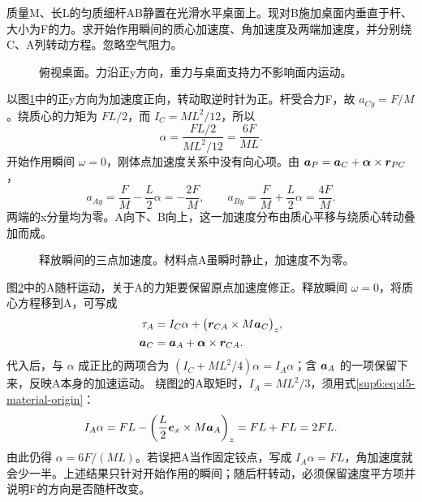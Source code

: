 \begin{example}[运动杆端取矩]\label{sup6:problem-example-1}\label{sup6:ex:d5-e1}
质量M、长L的匀质细杆AB静置在光滑水平桌面上。现对B施加桌面内垂直于杆、大小为F的力。求开始作用瞬间的质心加速度、角加速度及两端加速度，并分别绕C、A列转动方程。忽略空气阻力。
\end{example}
\begin{figure}[H]\centering
{}
\caption{俯视桌面。力沿正y方向，重力与桌面支持力不影响面内运动。}\label{sup6:fig:d5-e1-q}
\end{figure}
\begin{solution}
以图\ref{sup6:fig:d5-e1-q}中的正y方向为加速度正向，转动取逆时针为正。杆受合力F，故 $a_{Cy}=F/M$。绕质心的力矩为 $FL/2$，而 $I_C=ML^2/12$，所以
\[
\alpha=\frac{FL/2}{ML^2/12}=\frac{6F}{ML}.
\]
开始作用瞬间 $\omega=0$，刚体点加速度关系中没有向心项。由 $\bm{a}_P=\bm{a}_C+\bm{\alpha}\times\bm{r}_{PC}$，
\[
a_{Ay}=\frac FM-\frac L2\alpha=-\frac{2F}M,
\qquad a_{By}=\frac FM+\frac L2\alpha=\frac{4F}M.
\]
两端的x分量均为零。A向下、B向上，这一加速度分布由质心平移与绕质心转动叠加而成。
\begin{figure}[H]\centering
{}
\caption{释放瞬间的三点加速度。材料点A虽瞬时静止，加速度不为零。}\label{sup6:fig:d5-e1-s}
\end{figure}
图\ref{sup6:fig:d5-e1-s}中的A随杆运动，关于A的力矩要保留原点加速度修正。释放瞬间 $\omega=0$，将质心方程移到A，可写成
\[
\begin{aligned}
\tau_A&=I_C\alpha+\big(\bm{r}_{CA}\times M\bm{a}_C\big)_z,\\
\bm{a}_C&=\bm{a}_A+\bm{\alpha}\times\bm{r}_{CA}.
\end{aligned}
\]
代入后，与 $\alpha$ 成正比的两项合为 $(I_C+ML^2/4)\alpha=I_A\alpha$；含 $\bm{a}_A$ 的一项保留下来，反映A本身的加速运动。
绕图\ref{sup6:fig:d5-e1-s}的A取矩时，$I_A=ML^2/3$，须用式\eqref{sup6:eq:d5-material-origin}：
\[
I_A\alpha=FL-\left(\frac L2\bm{e}_x\times M\bm{a}_A\right)_z
=FL+FL=2FL.
\]
由此仍得 $\alpha=6F/(ML)$。若误把A当作固定铰点，写成 $I_A\alpha=FL$，角加速度就会少一半。上述结果只针对开始作用的瞬间；随后杆转动，必须保留速度平方项并说明F的方向是否随杆改变。
\end{solution}



